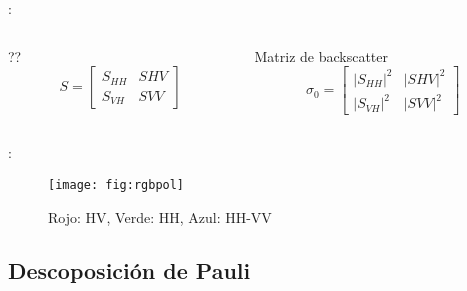 \begin{frame}{\secname : \subsecname}
  \begin{columns}
    \begin{column}{0.5\textwidth}
     \begin{block}{??}
      \begin{equation}
        S=
  \begin{bmatrix}
    S_{HH} & S{HV} \\
    S_{VH} & S{VV}
  \end{bmatrix}
      \end{equation}
     \end{block}
    \end{column}
    \begin{column}{0.5\textwidth}  %
      \begin{block}{Matriz de backscatter}
        \begin{equation}
          \sigma_0=
  \begin{bmatrix}
    |S_{HH}|^2 & |S{HV}|^2 \\
    |S_{VH}|^2 & |S{VV}|^2
  \end{bmatrix}
        \end{equation}
      \end{block}
    \end{column}
    \end{columns}
\end{frame}

\begin{frame}{\secname : \subsecname}
  \begin{figure}
    \centering
    \texttt{[image: fig:rgbpol]}
    \caption{Rojo: HV, Verde: HH, Azul: HH-VV}
    \label{}
  \end{figure}
\end{frame}

\subsection{Descoposición de Pauli}

